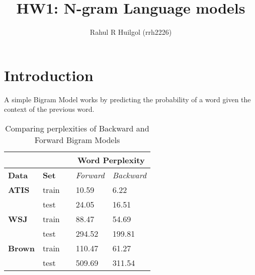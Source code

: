 \documentclass{article}
\begin{document}
\title{HW1: N-gram Language models}
\author{Rahul R Huilgol (rrh2226)}
\maketitle

\section{Introduction}
A simple Bigram Model works by predicting the probability of a word given the context of the previous word. 
\begin{table}[h]
\centering
\begin{tabular}{@{}lllll@{}}
\toprule
\textbf{}      & \textbf{}    &  & \multicolumn{2}{c}{\textbf{Word Perplexity}} \\ \midrule
\textbf{Data}  & \textbf{Set} &  & \textit{Forward}     & \textit{Backward}     \\ \midrule
\textbf{ATIS}  & train        &  & 10.59               & 6.22               \\ \midrule
               & test         &  & 24.05               & 16.51                \\ \midrule
\textbf{WSJ}   & train        &  & 88.47               & 54.69                \\ \midrule
               & test         &  & 294.52               & 199.81               \\ \midrule
\textbf{Brown} & train        &  & 110.47              & 61.27                \\ \midrule
               & test         &  & 509.69              & 311.54               \\ \bottomrule
\end{tabular}
\caption{Comparing perplexities of Backward and Forward Bigram Models}
\label{backvforw}
\end{table}
\end{document}
